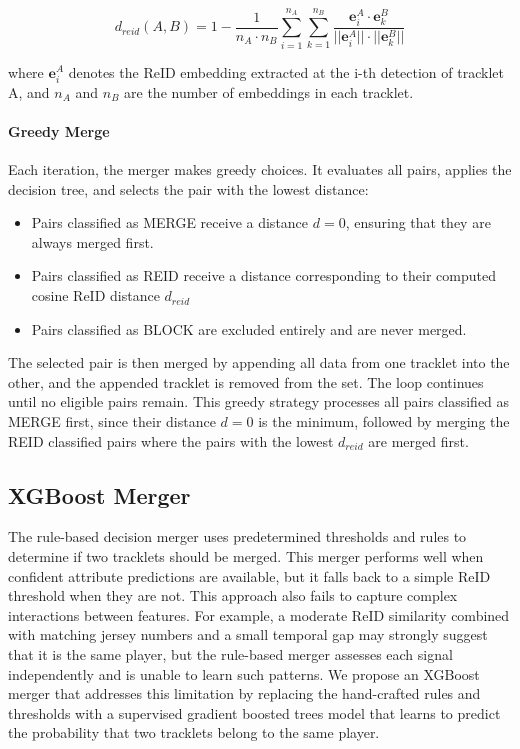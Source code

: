 \begin{equation}\label{eq:cos_reid_dist}
    d_{reid}(A,B)=1 - \frac{1}{n_A \cdot n_B} \sum_{i=1}^{n_A}\sum_{k=1}^{n_B} \frac{\textbf{e}_i^A \cdot \textbf{e}_k^B} {||\textbf{e}_i^A|| \cdot ||\textbf{e}_k^B||}
\end{equation}

where $\textbf{e}_i^A$ denotes the ReID embedding extracted at the i-th detection of tracklet A, and $n_A$ and $n_B$ are the number of embeddings in each tracklet.




\paragraph{Greedy Merge}
Each iteration, the merger makes greedy choices. It evaluates all pairs, applies the decision tree, and selects the pair with the lowest distance:

\begin{itemize}
    \item Pairs classified as MERGE receive a distance $d=0$, ensuring that they are always merged first.
    \item Pairs classified as REID receive a distance corresponding to their computed cosine ReID distance $d_{reid}$
    \item Pairs classified as BLOCK are excluded entirely and  are never merged.
\end{itemize}

The selected pair is then merged by appending all data from one tracklet into the other, and the appended tracklet is removed from the set. The loop continues until no eligible pairs remain. This greedy strategy processes all pairs classified as MERGE first, since their distance $d=0$ is the minimum, followed by merging the REID classified pairs where the pairs with the lowest $d_{reid}$ are merged first. 



\subsection{XGBoost Merger}
The rule-based decision merger uses predetermined thresholds and rules to determine if two tracklets should be merged. This merger performs well when confident attribute predictions are available, but it falls back to a simple ReID threshold when they are not. This approach also fails to capture complex interactions between features. For example, a moderate  ReID similarity combined with matching jersey numbers and a small temporal gap may strongly suggest that it is the same player, but the rule-based merger assesses each signal independently and is unable to learn such patterns. We propose an XGBoost merger that addresses this limitation by replacing the hand-crafted rules and thresholds with a supervised gradient boosted trees model that learns to predict the probability that two tracklets belong to the same player.

